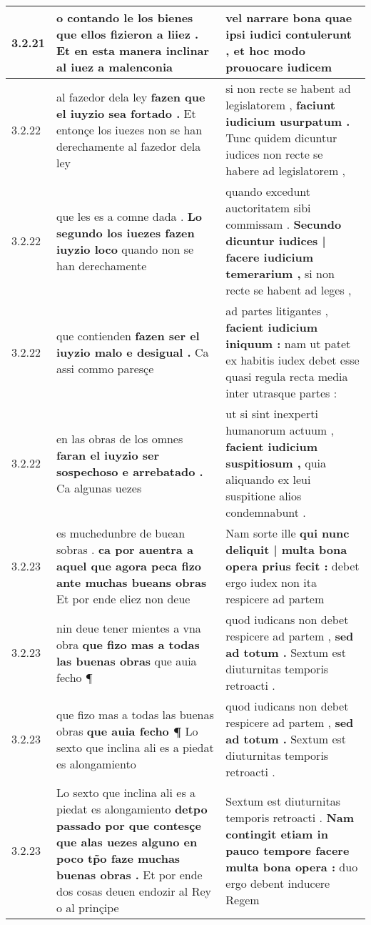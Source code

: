 \begin{tabular}{|p{1cm}|p{6.5cm}|p{6.5cm}|}
3.2.21 & o contando le los bienes \textbf{ que ellos fizieron a liiez . } Et en esta manera inclinar al iuez a malenconia & vel narrare bona \textbf{ quae ipsi iudici contulerunt , } et hoc modo prouocare iudicem \\\hline
3.2.22 & al fazedor dela ley \textbf{ fazen que el iuyzio sea fortado . } Et entonçe los iuezes non se han derechamente al fazedor dela ley & si non recte se habent ad legislatorem , \textbf{ faciunt iudicium usurpatum . } Tunc quidem dicuntur iudices non recte se habere ad legislatorem , \\\hline
3.2.22 & que les es a comne dada . \textbf{ Lo segundo los iuezes fazen iuyzio loco } quando non se han derechamente & quando excedunt auctoritatem sibi commissam . \textbf{ Secundo dicuntur iudices | facere iudicium temerarium , } si non recte se habent ad leges , \\\hline
3.2.22 & que contienden \textbf{ fazen ser el iuyzio malo e desigual . } Ca assi commo paresçe & ad partes litigantes , \textbf{ facient iudicium iniquum : } nam ut patet ex habitis iudex debet esse quasi regula recta media inter utrasque partes : \\\hline
3.2.22 & en las obras de los omnes \textbf{ faran el iuyzio ser sospechoso e arrebatado . } Ca algunas uezes & ut si sint inexperti humanorum actuum , \textbf{ facient iudicium suspitiosum , } quia aliquando ex leui suspitione alios condemnabunt . \\\hline
3.2.23 & es muchedunbre de buean sobras . \textbf{ ca por auentra a aquel que agora peca fizo ante muchas bueans obras } Et por ende eliez non deue & Nam sorte ille \textbf{ qui nunc deliquit | multa bona opera prius fecit : } debet ergo iudex non ita respicere ad partem \\\hline
3.2.23 & nin deue tener mientes a vna obra \textbf{ que fizo mas a todas las buenas obras } que auia fecho ¶ & quod iudicans non debet respicere ad partem , \textbf{ sed ad totum . } Sextum est diuturnitas temporis retroacti . \\\hline
3.2.23 & que fizo mas a todas las buenas obras \textbf{ que auia fecho ¶ } Lo sexto que inclina ali es a piedat es alongamiento & quod iudicans non debet respicere ad partem , \textbf{ sed ad totum . } Sextum est diuturnitas temporis retroacti . \\\hline
3.2.23 & Lo sexto que inclina ali es a piedat es alongamiento \textbf{ detpo passado por que contesçe que alas uezes alguno en poco tp̃o faze muchas buenas obras . } Et por ende dos cosas deuen endozir al Rey o al prinçipe & Sextum est diuturnitas temporis retroacti . \textbf{ Nam contingit etiam in pauco tempore facere multa bona opera : } duo ergo debent inducere Regem \\\hline

\end{tabular}
